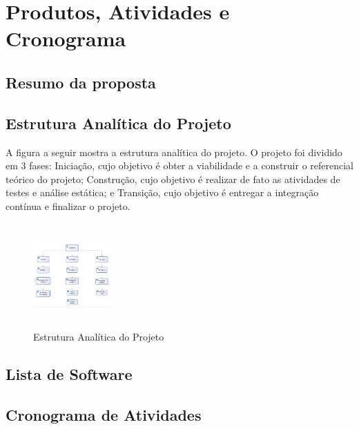 \chapter[Produtos, Atividades e Cronograma]{Produtos, Atividades e Cronograma}

\section{Resumo da proposta}
\section{Estrutura Analítica do Projeto}

A figura a seguir mostra a estrutura analítica do projeto. O projeto foi dividido em 3 fases: Iniciação, cujo objetivo é obter a viabilidade e a construir o referencial teórico do projeto; Construção, cujo objetivo é realizar de fato as atividades de testes e análise estática; e Transição, cujo objetivo é entregar a integração contínua e finalizar o projeto.

\begin{figure}[h]
 \centering
 \includegraphics[width=3cm, height=4cm]{figuras/eap.png}
 \caption{Estrutura Analítica do Projeto}
\end{figure}

\section{Lista de Software}
\section{Cronograma de Atividades}
